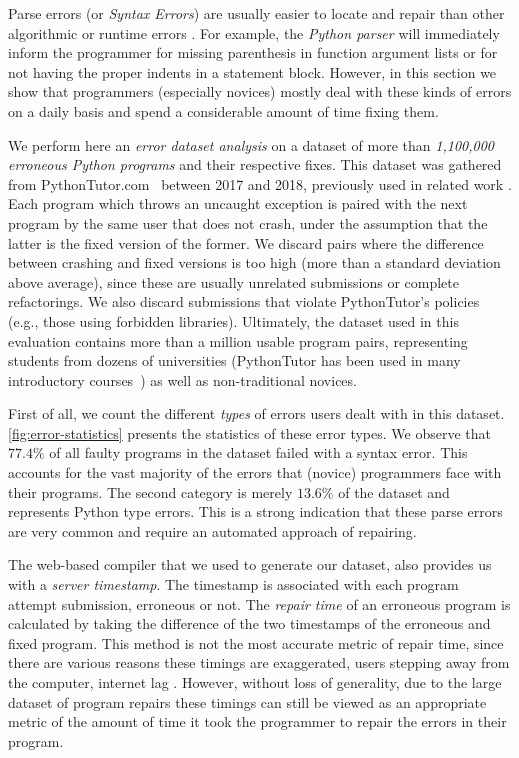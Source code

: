 Parse errors (or \emph{Syntax Errors}) are usually easier to locate and repair
than other algorithmic or runtime errors \citep{Denny_2012}. For example, the
\emph{Python parser} will immediately inform the programmer for missing
parenthesis in function argument lists or for not having the proper indents in a
statement block. However, in this section we show that programmers (especially
novices) mostly deal with these kinds of errors on a daily basis and spend a
considerable amount of time fixing them.

We perform here an \emph{error dataset analysis} on a \python dataset of more
than \emph{1,100,000 erroneous Python programs} and their respective fixes. This
dataset was gathered from PythonTutor.com~\citep{Guo2013} between 2017 and 2018,
previously used in related work \citep{Endres2019, Cosman2020}. Each program
which throws an uncaught \python exception is paired with the next program by
the same user that does not crash, under the assumption that the latter is the
fixed version of the former. We discard pairs where the difference between
crashing and fixed versions is too high (more than a standard deviation above
average), since these are usually unrelated submissions or complete
refactorings. We also discard submissions that violate PythonTutor's policies
(e.g., those using forbidden libraries). Ultimately, the dataset used in this
evaluation contains more than a million usable program pairs, representing
students from dozens of universities (PythonTutor has been used in many
introductory courses~\citep{Guo2013}) as well as non-traditional novices.

First of all, we count the different \emph{types} of errors users dealt with in
this dataset. \autoref{fig:error-statistics} presents the statistics of these
error types. We observe that $77.4 \% $ of all faulty programs in the dataset
failed with a syntax error. This accounts for the vast majority of the errors
that (novice) programmers face with their programs. The second category is
merely $13.6\%$ of the dataset and represents Python type errors. This is a
strong indication that these parse errors are very common and require an
automated approach of repairing.

The web-based compiler that we used to generate our dataset, also provides us
with a \emph{server timestamp}. The timestamp is associated with each program
attempt submission, erroneous or not. The \emph{repair time} of an erroneous
program is calculated by taking the difference of the two timestamps of the
erroneous and fixed program. This method is not the most accurate metric of
repair time, since there are various reasons these timings are exaggerated, \eg
users stepping away from the computer, internet lag \etc. However, without loss
of generality, due to the large dataset of program repairs these timings can
still be viewed as an appropriate metric of the amount of time it took the
programmer to repair the errors in their program.

